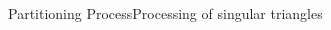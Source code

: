 \documentclass[compress,10pt,aspectratio=169]{beamer}
\begin{document}
\begin{frame}{Partitioning Process}{Processing of singular triangles}
\begin{columns}
\begin{column}{0.7\textwidth}
\centering
{}
\end{column}
\end{columns}
\end{frame}
\end{document}
